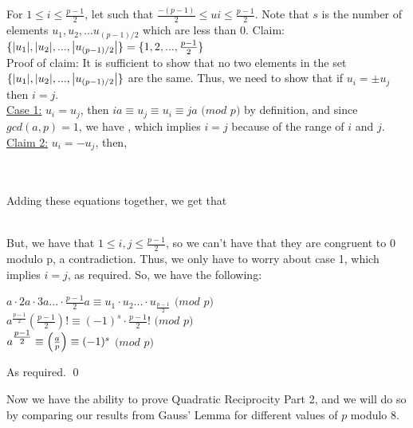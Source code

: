 \documentclass[../main.tex]{subfiles}
\begin{document}
\begin{pf}
    For $1 \leq i \leq \tfrac{p-1}{2}$, let  such that $\tfrac{-(p-1)}{2} \leq ui \leq \tfrac{p-1}{2}$. Note that $s$ is the number of elements $u_1,u_2,...u_{(p-1)/2}$ which are less than 0. \sspace
    Claim: $\{\abs{u_1},\abs{u_2},...,\abs{u_{(p-1)/2}}\}=\{1,2,...,\tfrac{p-1}{2}\}$ \\
    Proof of claim: It is sufficient to show that no two elements in the set $\{\abs{u_1},\abs{u_2},...,\abs{u_{(p-1)/2}}\}$ are the same. Thus, we need to show that if $u_i=\pm u_j$ then $i=j$. \\
    \underline{Case 1:} $u_i=u_j$, then $ia \equiv u_j \equiv u_i \equiv ja$ $(mod$ $p)$ by definition, and since $gcd(a,p)=1$, we have , which implies $i=j$ because of the range of $i$ and $j$. \\
    \underline{Claim 2:} $u_i=-u_j$, then,
    \begin{center}
         \\
         \\
        Adding these equations together, we get that \\
         \\
    \end{center}
\end{pf}
\begin{pf}[cont.]
    But, we have that $1 \leq i,j \leq \tfrac{p-1}{2}$, so we can't have that they are congruent to 0 modulo p, a contradiction. Thus, we only have to worry about case 1, which implies $i=j$, as required. \sspace
    So, we have the following:
    \begin{center}
        $a\cdot2a\cdot3a...\cdot\tfrac{p-1}{2}a \equiv u_1\cdot u_2...\cdot u_{\tfrac{p-1}{2}}$ $(mod$ $p)$ \\
        $a^{\tfrac{p-1}{2}}(\tfrac{p-1}{2})! \equiv (-1)^s\cdot \tfrac{p-1}{2}!$ $(mod$ $p)$ \\
        $a^{\tfrac{p-1}{2}} \equiv \Big(\frac{a}{p}\Big) \equiv (-1)^s$ $(mod$ $p)$
    \end{center}
    As required. \qed
\end{pf}

Now we have the ability to prove Quadratic Reciprocity Part 2, and we will do so by comparing our results from Gauss' Lemma for different values of $p$ modulo 8.
\end{document}
